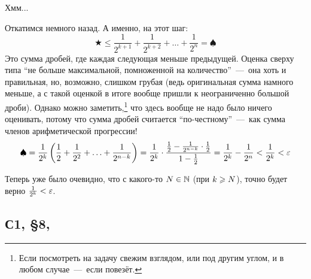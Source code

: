 \documentclass[a4paper,12pt]{article}
\begin{document}
\begin{solution}
    Хмм...
    
    \medskip
    
    Откатимся немного назад.
    А именно, на этот шаг:
    \[
      \bigstar \leq \frac{1}{2^{k + 1}} + \frac{1}{2^{k + 2}} + \ldots + \frac{1}{2^n} = \spadesuit
    \]
    Это сумма дробей, где каждая следующая меньше предыдущей.
    Оценка сверху типа ``не больше максимальной, помноженной на количество''~---~она хоть и правильная, но, возможно, слишком грубая (ведь оригинальная сумма намного меньше, а с такой оценкой в итоге вообще пришли к неограниченно большой дроби).
    Однако можно заметить,\footnote{
      Если посмотреть на задачу свежим взглядом, или под другим углом, и в любом случае~---~если повезёт.
    } что здесь вообще не надо было ничего оценивать, потому что сумма дробей считается ``по-честному''~---~как сумма членов арифметической прогрессии!
    \[
      \spadesuit = \frac{1}{2^k} \left(\frac{1}{2} + \frac{1}{2^2} + \ldots + \frac{1}{2^{n - k}}\right)
      = \frac{1}{2^k} \cdot \frac{\frac{1}{2} - \frac{1}{2^{n - k}} \cdot \frac{1}{2}}{1 - \frac{1}{2}}
      = \frac{1}{2^k} - \frac{1}{2^n}
      < \frac{1}{2^k} < \varepsilon
    \]
    
    Теперь уже было очевидно, что с какого-то $N \hm\in \NN$ (при $k \hm\geq N$), точно будет верно $\frac{1}{2^k} \hm< \eps$.
  \end{solution}
  
  
  \subsection{С1, \S 8, }
  
\end{document}
